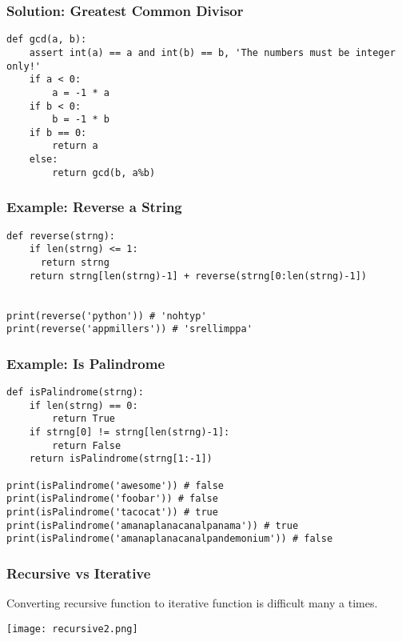 \begin{frame}[fragile]
	\frametitle{Solution: Greatest Common Divisor}

		\begin{lstlisting}
def gcd(a, b):
    assert int(a) == a and int(b) == b, 'The numbers must be integer only!'
    if a < 0:
        a = -1 * a
    if b < 0:
        b = -1 * b
    if b == 0:
        return a
    else:
        return gcd(b, a%b)		
		\end{lstlisting}
		
\end{frame}


\begin{frame}[fragile]
	\frametitle{Example: Reverse a String}

		\begin{lstlisting}
def reverse(strng):
    if len(strng) <= 1:
      return strng
    return strng[len(strng)-1] + reverse(strng[0:len(strng)-1])


print(reverse('python')) # 'nohtyp'
print(reverse('appmillers')) # 'srellimppa'
		\end{lstlisting}
		
\end{frame}

\begin{frame}[fragile]
	\frametitle{Example: Is Palindrome}

		\begin{lstlisting}
def isPalindrome(strng):
    if len(strng) == 0:
        return True
    if strng[0] != strng[len(strng)-1]:
        return False
    return isPalindrome(strng[1:-1])

print(isPalindrome('awesome')) # false
print(isPalindrome('foobar')) # false
print(isPalindrome('tacocat')) # true
print(isPalindrome('amanaplanacanalpanama')) # true
print(isPalindrome('amanaplanacanalpandemonium')) # false
		\end{lstlisting}
		
\end{frame}


\begin{frame}[fragile]
	\frametitle{Recursive vs Iterative}

Converting recursive function to iterative function is difficult many a times.

\begin{center}
\texttt{[image: recursive2.png]}
\end{center}


\end{frame}


